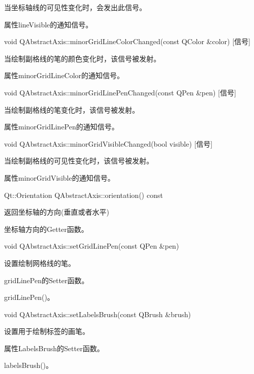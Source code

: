 当坐标轴线的可见性变化时，会发出此信号。

\begin{notice}
属性lineVisible的通知信号。
\end{notice}

void QAbstractAxis::minorGridLineColorChanged(const QColor \&color)
[信号]

 当绘制副格线的笔的颜色变化时，该信号被发射。 

\begin{notice}
属性minorGridLineColor的通知信号。
\end{notice}

void QAbstractAxis::minorGridLinePenChanged(const QPen \&pen) [信号] 

当绘制副格线的笔变化时，该信号被发射。 

\begin{notice}
属性minorGridLinePen的通知信号。
\end{notice}

void QAbstractAxis::minorGridVisibleChanged(bool visible) [信号] 

当绘制副格线的可见性变化时，该信号被发射。 

\begin{notice}
属性minorGridVisible的通知信号。
\end{notice}

Qt::Orientation QAbstractAxis::orientation() const 

返回坐标轴的方向(垂直或者水平) 

\begin{notice}
坐标轴方向的Getter函数。
\end{notice}

void QAbstractAxis::setGridLinePen(const QPen \&pen) 

设置绘制网格线的笔。 

\begin{notice}
gridLinePen的Setter函数。
\end{notice}

\begin{seeAlso}
gridLinePen()。
\end{seeAlso}

void QAbstractAxis::setLabelsBrush(const QBrush \&brush)

设置用于绘制标签的画笔。 

\begin{notice}
属性LabelsBrush的Setter函数。
\end{notice}

\begin{seeAlso}
labelsBrush()。
\end{seeAlso}

